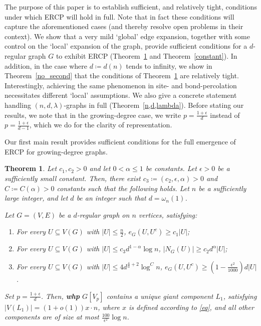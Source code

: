 \documentclass[notitlepage]{scrartcl}
\newtheorem{theorem}{Theorem}
\begin{document}
The purpose of this paper is to establish sufficient, and relatively tight, conditions under which ERCP will hold in full. Note that in fact these conditions will capture the aforementioned cases (and thereby resolve open problems in their context). We show that a very mild `global' edge expansion, together with some control on the ‘local’ expansion of the graph, provide sufficient conditions for a $d$-regular graph $G$ to exhibit ERCP (Theorem~\ref{general} and Theorem~\ref{constant}). In addition, in the case where $d\coloneqq d(n)$ tends to infinity, we show in Theorem~\ref{no_second} that the conditions of Theorem~\ref{general} are relatively tight. Interestingly, achieving the same phenomenon in site- and bond-percolation necessitates different `local' assumptions. We also give a concrete statement handling $(n,d,\lambda)$-graphs in full (Theorem~\ref{n,d,lambda}). Before stating our results, we note that in the growing-degree case, we write $p=\frac{1+\epsilon}{d}$ instead of $p=\frac{1+\epsilon}{d-1}$, which we do for the clarity of representation.

Our first main result provides sufficient conditions for the full emergence of ERCP for growing-degree graphs.

\begin{theorem} \label{general}
    Let $c_1,c_2>0$ and let $0<\alpha\le 1$ be constants. Let $\epsilon>0$ be a sufficiently small constant. Then, there exist $c_3\coloneqq (c_2,\epsilon,\alpha)>0$ and $C\coloneqq C(\alpha)>0$ constants such that the following holds. Let $n$ be a sufficiently large integer, and let $d$ be an integer such that $d=\omega_n(1)$.
    
    Let $G=(V,E)$ be a $d$-regular graph on $n$ vertices, satisfying:
    \begin{enumerate}[(P\arabic*{})]
        \item For every $U\subseteq V(G)$ with $|U|\leq \frac{n}{2}$, $e_G(U,U^c)\ge c_1|U|$; \label{prop0A}
        \item For every $U\subseteq V(G)$ with $|U|\leq c_3d^{1-\alpha}\log n$, $|N_G(U)|\ge c_2d^\alpha|U|$; \label{prop1A}
        \item For every $U\subseteq V(G)$ with $|U|\leq 4d^{\frac{4}{\alpha}+2}\log^C n$, $e_G(U,U^c)\ge (1-\frac{\epsilon^2}{1000})d|U|$. \label{prop2A}
    \end{enumerate}
    Set $p=\frac{1+\epsilon}{d}$. Then, \textbf{whp} $G[V_p]$ contains a unique giant component $L_1$, satisfying $|V(L_1)| = (1 + o(1))x\cdot n$, where $x$ is defined according to \eqref{eq}, and all other components are of size at most $\frac{100}{\epsilon^2}\log n$.
\end{theorem}
\end{document}
